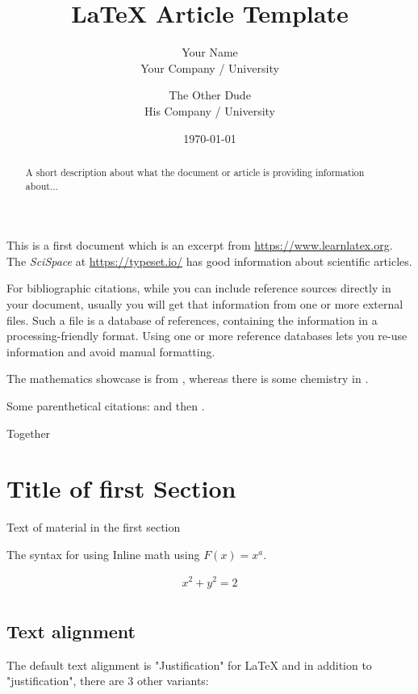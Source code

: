 \documentclass[12]{article}
\title{\LaTeX{} Article Template}
\author{Your Name  \\
	    Your Company / University  \\
	    \and 
	    The Other Dude \\
	    His Company / University \\
	    }
\date{\today}
\begin{document}
\maketitle

\setcounter{tocdepth}{4}
\tableofcontents

\begin{abstract} 
A short description about what the document or article is providing information about... 
\end{abstract}

    This is a first document which is an excerpt from \url{https://www.learnlatex.org}. The \textit{SciSpace} at \url{https://typeset.io/} has good information about scientific articles.

    For bibliographic citations, while you can include reference sources directly in your document, usually you will get that information from one or more external files. Such a file is a database of references, containing the information in a processing-friendly format. Using one or more reference databases lets you re-use information and avoid manual formatting.

    The mathematics showcase is from \cite{Graham1995}, whereas there is some chemistry in \citet[p.~56]{Thomas2008}.

    Some parenthetical citations: \citep{Graham1995}
    and then \citep[p.~56]{Thomas2008}.

    \citep[See][pp.~45-~48]{Graham1995}

    Together \citep{Graham1995,Thomas2008} 

    

    \section{Title of first Section}%
    \label{sec:first-section}
    Text of material in the first section
 
    The syntax for using Inline math using \begin{math}F(x) = x^{a}\end{math}.

    \begin{align*}
        \label{eq:fraction}
        x^2 + y^2 = 2 \\
    \end{align*}

    \subsection{Text alignment}
    The default text alignment is "Justification" for LaTeX and in addition to "justification", there are \textrm{3} other variants:
\end{document}
